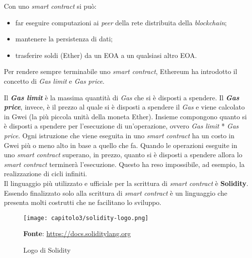 \noindent Con uno \textit{smart contract} si può:
\begin{itemize}
  \item far eseguire computazioni ai \textit{peer} della rete distribuita della \textit{blockchain};
  \item mantenere la persistenza di dati;
  \item trasferire soldi (Ether) da un EOA a un qualsiasi altro EOA.
\end{itemize}

Per rendere sempre terminabile uno \textit{smart contract}, Ethereum ha introdotto il concetto di \textit{Gas limit} e \textit{Gas price}.

Il \textbf{\textit{Gas limit}} è la massima quantità di \textit{Gas} che si è disposti a spendere. Il \textbf{\textit{Gas price}}, invece, è il prezzo al quale si è disposti a spendere il \textit{Gas} e viene calcolato in Gwei (la più piccola unità della moneta Ether). Insieme compongono quanto si è disposti a spendere per l'esecuzione di un'operazione, ovvero \textit{Gas limit} * \textit{Gas price}. Ogni istruzione che viene eseguita in uno \textit{smart contract} ha un costo in Gwei più o meno alto in base a quello che fa. Quando le operazioni eseguite in uno \textit{smart contract} superano, in prezzo, quanto si è disposti a spendere allora lo \textit{smart contract} terminerà l'esecuzione. Questo ha reso impossibile, ad esempio, la realizzazione di cicli infiniti. \\

Il linguaggio più utilizzato e ufficiale per la scrittura di \textit{smart contract} è \textbf{Solidity}. Essendo finalizzato solo alla scrittura di \textit{smart contract} è un linguaggio che presenta molti costrutti che ne facilitano lo sviluppo.

\begin{figure}[h!]
  \centering
  \texttt{[image: capitolo3/solidity-logo.png]}
  \caption{Logo di Solidity}
  \textbf{Fonte}: \href{https://docs.soliditylang.org/en/v0.8.6}{https://docs.soliditylang.org}
\end{figure}


